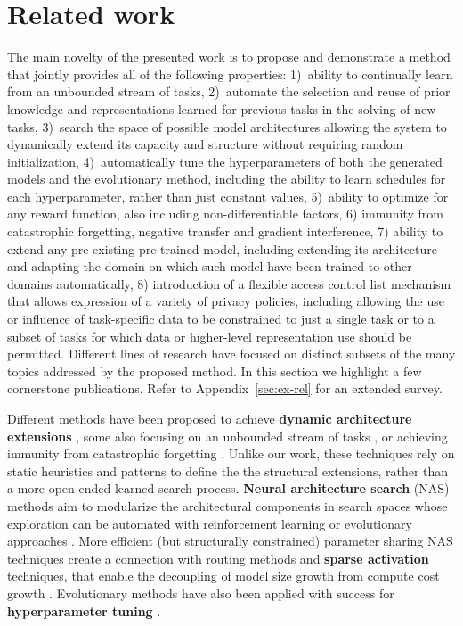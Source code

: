 \documentclass{article} \usepackage{iclr2023_conference,times}
\begin{document}
\section{Related work}
The main novelty of the presented work is to propose and demonstrate a method that jointly provides all of the following properties:
1)~ability to continually learn from an unbounded stream of tasks,
2)~automate the selection and reuse of prior knowledge and representations learned for previous tasks in the solving of new tasks,
3)~search the space of possible model architectures allowing the system to dynamically extend its capacity and structure without requiring random initialization,
4)~automatically tune the hyperparameters of both the generated models and the evolutionary method, including the ability to learn schedules for each hyperparameter, rather than just constant values,
5)~ability to optimize for any reward function, also including non-differentiable factors,
6) immunity from catastrophic forgetting, negative transfer and gradient interference,
7) ability to extend any pre-existing
pre-trained model, including extending 
its architecture
and adapting the domain on which such model have been trained to other domains automatically,
8) introduction of a flexible access control list mechanism that allows  expression of a variety of privacy policies,
including allowing the use or influence of task-specific data to be constrained to just a single task or to a subset of tasks for which data or higher-level representation use should be permitted. Different lines of research have focused on distinct subsets of the many topics addressed by the proposed method.
In this section we highlight a few cornerstone publications.
Refer to Appendix~\ref{sec:ex-rel} for an extended survey.

Different methods have been proposed to achieve \textbf{dynamic architecture extensions} \citep{Chen2016Net2NetAL,Cai2018EfficientAS},
some also focusing on an unbounded stream of tasks \citep{Yoon2018LifelongLW}, or achieving immunity from catastrophic forgetting  \citep{Rusu2016ProgressiveNN,Li2018LearningWF,Rosenfeld2020IncrementalLT}.
Unlike our work, these techniques rely on static heuristics and patterns to define the the structural extensions, rather than a more open-ended learned search process.
\textbf{Neural architecture search} (NAS) \citep{Zoph2017NeuralAS} methods aim to modularize the architectural components in search spaces whose exploration can be automated with reinforcement learning or evolutionary approaches \citep{Real2019RegularizedEF,Maziarz2018EvolutionaryNeuralHA}.
More efficient (but structurally constrained) parameter sharing NAS techniques \citep{Pham2018EfficientNA,Liu2019DARTSDA} create a connection with routing methods \citep{Fernando2017PathNetEC} and \textbf{sparse activation} techniques, 
that enable the decoupling of model size growth from compute cost growth
\citep{Shazeer2017OutrageouslyLN,Du2021GLaMES}.
Evolutionary methods have also been applied with success for \textbf{hyperparameter tuning} \citep{Jaderberg2017PopulationBT}.
\end{document}
